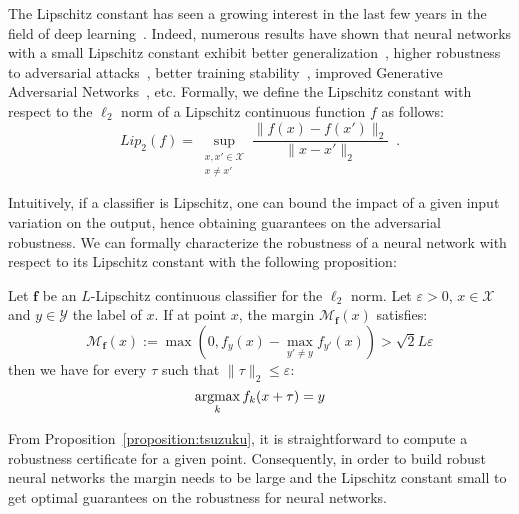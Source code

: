 The Lipschitz constant has seen a growing interest in the last few years in the field of deep learning~\citep{scaman2018lipschitz,fazlyab2019efficient,combettes2020lipschitz,bethune2021many}.
Indeed, numerous results have shown that neural networks with a small Lipschitz constant exhibit better generalization~\citep{bartlett2017spectrally}, higher robustness to adversarial attacks~\citep{szegedy2014intriguing,farnia2018generalizable,tsuzuku2018lipschitz}, better training stability~\citep{xiao2018dynamical,trockman2021orthogonalizing}, improved Generative Adversarial Networks~\citep{arjovsky2017wasserstein}, etc.
Formally, we define the Lipschitz constant with respect to the $\ell_2$ norm of a Lipschitz continuous function $f$ as follows:
\begin{equation*}
  Lip_{2}{(f)} = \sup_{\substack{x, x' \in \mathcal{X} \\ x \neq x'}} \frac{\lVert f(x) - f(x') \rVert_2}{\lVert x - x' \rVert_2} \enspace.
\end{equation*}

Intuitively, if a classifier is Lipschitz, one can bound the impact of a given input variation on the output, hence obtaining guarantees on the adversarial robustness.
We can formally characterize the robustness of a neural network with respect to its Lipschitz constant with the following proposition:
\begin{prop} \label{proposition:tsuzuku}
Let $\mathbf{f}$ be an $L$-Lipschitz continuous classifier for the $\ell_2$ norm.
Let $\varepsilon > 0$, $x \in \mathcal{X}$ and $y \in \mathcal{Y}$ the label of $x$.
If at point $x$, the margin $\mathcal{M}_{\mathbf{f}}(x)$ satisfies:
\begin{equation*}
  \mathcal{M}_{\mathbf{f}}(x):=\max(0,f_y(x)-\max_{y'\neq y}f_{y'}(x)) > \sqrt{2} L \varepsilon
\end{equation*}
then we have for every $\tau$ such that $\lVert \tau \rVert_2 \leq \varepsilon$:
\begin{equation*}
  \operatorname*{argmax}_{k}f_k(x + \tau) = y
\end{equation*}
\end{prop}
From Proposition~\ref{proposition:tsuzuku}, it is straightforward to compute a robustness certificate for a given point.
Consequently, in order to build robust neural networks the margin needs to be large and the Lipschitz constant small to get optimal guarantees on the robustness for neural networks.



